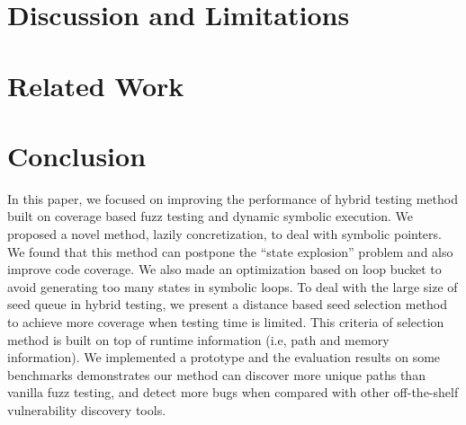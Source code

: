 \documentclass{cta-author}
\begin{document}
\section{Discussion and Limitations} \label{sec:discussion}


\section{Related Work} \label{sec:related}


\section{Conclusion} \label{sec:conclusion}
In this paper, we focused on improving the performance of hybrid testing method built on coverage based fuzz testing and dynamic symbolic execution. We proposed a novel method, lazily concretization, to deal with symbolic pointers. We found that this method can postpone the ``state explosion'' problem and also improve code coverage. We also made an optimization based on loop bucket to avoid generating too many states in symbolic loops. To deal with the large size of seed queue in hybrid testing, we present a distance based seed selection method to achieve more coverage when testing time is limited. This criteria of selection method is built on top of runtime information (i.e, path and memory information). We implemented a prototype and the evaluation results on some benchmarks demonstrates our method can discover more unique paths than vanilla fuzz testing, and detect more bugs when compared with other off-the-shelf vulnerability discovery tools.
\end{document}
